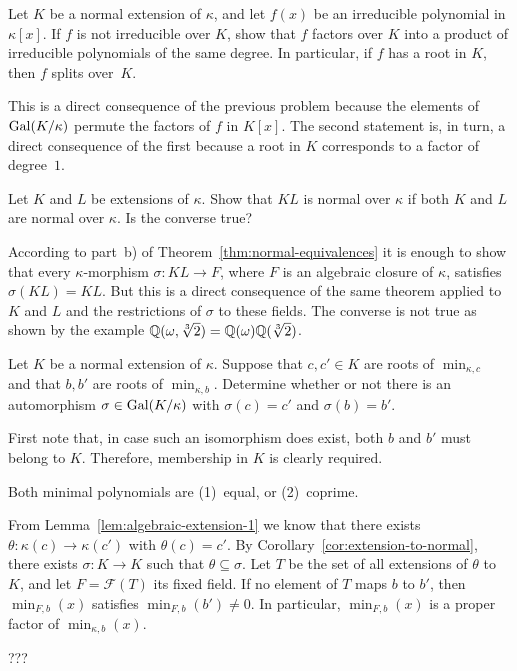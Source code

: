 \begin{probl}\label{probl:normal-equivalence}
    Let\/ $K$ be a normal extension of\/ $\kappa$, and let\/ $f(x)$ be an irreducible polynomial in\/ $\kappa[x]$. If\/ $f$ is not irreducible over\/ $K$, show that\/ $f$ factors over\/ $K$ into a product of irreducible polynomials of the same degree. In particular, if\/ $f$ has a root in\/ $K$, then\/ $f$ splits over\/~$K$. 
\end{probl}

\begin{solution}
    This is a direct consequence of the previous problem because the elements of $\operatorname{Gal}(K/\kappa)$ permute the factors of $f$ in $K[x]$. The second statement is, in turn, a direct consequence of the first because a root in $K$ corresponds to a factor of degree~$1$.
\end{solution}

\begin{probl}
    Let\/ $K$ and\/ $L$ be extensions of\/ $\kappa$. Show that\/ $KL$ is normal over\/ $\kappa$ if both\/ $K$ and\/ $L$ are normal over\/ $\kappa$. Is the converse true? 
\end{probl}

\begin{solution}
    According to part~b) of Theorem~\ref{thm:normal-equivalences} it is enough to show that every $\kappa$-morphism $\sigma\colon KL\to F$, where $F$ is an algebraic closure of $\kappa$, satisfies $\sigma(KL)=KL$. But this is a direct consequence of the same theorem applied to $K$ and $L$ and the restrictions of $\sigma$ to these fields. The converse is not true as shown by the example $\mathbb{Q}(\omega,\sqrt[3]2)=\mathbb{Q}(\omega)\mathbb{Q}(\sqrt[3]2)$.
\end{solution}

\begin{probl}
    Let\/ $K$ be a normal extension of\/ $\kappa$. Suppose that\/ $c, c' \in K$ are roots of\/ $\min_{\kappa,c}$ and that\/ $b, b'$ are roots of\/ $\min_{\kappa,b}$. Determine whether or not there is an automorphism\/ $\sigma\in\operatorname{Gal}(K/\kappa)$ with\/ $\sigma(c) = c'$ and\/ $\sigma(b) = b'$. 
\end{probl}

\begin{solution}
    First note that, in case such an isomorphism does exist, both $b$ and $b'$ must belong to $K$. Therefore, membership in $K$ is clearly required.

    Both minimal polynomials are (1)~equal, or (2)~coprime.
    
    From Lemma~\ref{lem:algebraic-extension-1} we know that there exists $\theta\colon\kappa(c)\to\kappa(c')$ with $\theta(c)=c'$. By Corollary~\ref{cor:extension-to-normal}, there exists $\sigma\colon K\to K$ such that $\theta\subseteq\sigma$. Let $T$ be the set of all extensions of $\theta$ to $K$, and let $F=\mathcal F(T)$ its fixed field. If no element of $T$ maps $b$ to $b'$, then $\min_{F,b}(x)$ satisfies $\min_{F,b}(b')\ne0$. In particular, $\min_{F,b}(x)$ is a proper factor of $\min_{\kappa,b}(x)$.

    ???
    
\end{solution}

